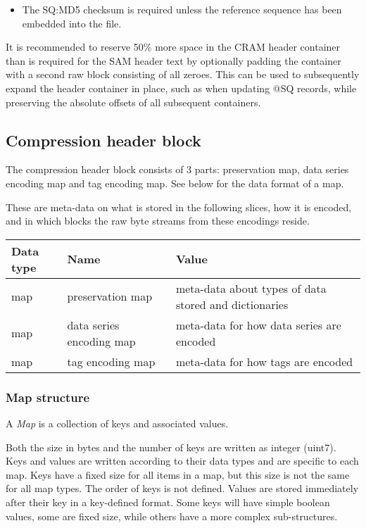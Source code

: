 \documentclass[a4paper]{article}
\begin{document}
\begin{itemize}
\item The SQ:MD5 checksum is required unless the reference sequence has been embedded 
into the file.
\end{itemize}

It is recommended to reserve 50\% more space in the CRAM header container than
is required for the SAM header text by optionally padding the container with a second
raw block consisting of all zeroes. This can be used to subsequently expand the header
container in place, such as when updating @SQ records, while preserving the absolute
offsets of all subsequent containers.

\subsection{Compression header block}
\label{subsec:compression-header}

The compression header block consists of 3 parts: preservation map, data series 
encoding map and tag encoding map.  See below for the data format of a map.

These are meta-data on what is stored in the following slices, how it is encoded, and in which blocks the raw byte streams from these encodings reside.

\begin{tabular}{|l|>{\raggedright}p{120pt}|>{\raggedright}p{260pt}|}
\hline
\textbf{Data type} & \textbf{Name} & \textbf{Value}
\tabularnewline
\hline
map & preservation map & meta-data about types of data stored and dictionaries \tabularnewline
\hline
map & data series encoding map & meta-data for how data series are encoded \tabularnewline
\hline
map & tag encoding map & meta-data for how tags are encoded \tabularnewline
\hline
\end{tabular}

\subsubsection{Map structure}

A \textit{Map} is a collection of keys and associated values.

Both the size in bytes and the number of keys are written as integer (uint7). Keys 
and values are written according to their data types and are specific to each map.
Keys have a fixed size for all items in a map, but this size is not
the same for all map types.  The order of keys is not defined.  Values
are stored immediately after their key in a key-defined format.  Some
keys will have simple boolean values, some are fixed size, while
others have a more complex sub-structures.
\end{document}

